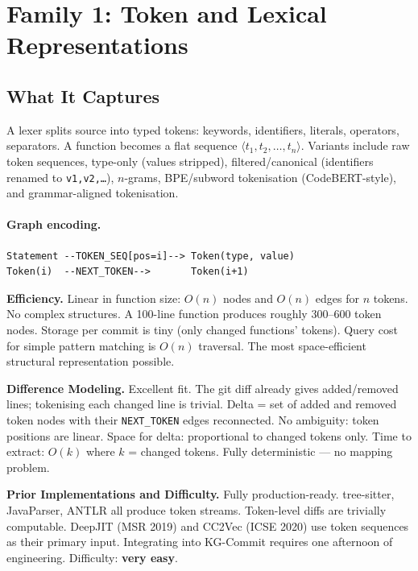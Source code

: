 \documentclass[12pt,a4paper]{article}
\begin{document}
\section{Family 1: Token and Lexical Representations}

\subsection{What It Captures}

A lexer splits source into typed tokens: keywords, identifiers, literals,
operators, separators. A function becomes a flat sequence
$\langle t_1, t_2, \ldots, t_n \rangle$. Variants include raw token sequences,
type-only (values stripped), filtered/canonical (identifiers renamed to
\texttt{v1,v2,\ldots}), $n$-grams, BPE/subword tokenisation (CodeBERT-style),
and grammar-aligned tokenisation.

\paragraph{Graph encoding.}
\begin{lstlisting}
Statement --TOKEN_SEQ[pos=i]--> Token(type, value)
Token(i)  --NEXT_TOKEN-->       Token(i+1)
\end{lstlisting}

\begin{effbox}
\textbf{Efficiency.}
Linear in function size: $O(n)$ nodes and $O(n)$ edges for $n$ tokens.
No complex structures. A 100-line function produces roughly 300--600 token
nodes. Storage per commit is tiny (only changed functions' tokens). Query cost
for simple pattern matching is $O(n)$ traversal. The most space-efficient
structural representation possible.
\end{effbox}

\begin{diffbox}
\textbf{Difference Modeling.}
Excellent fit. The git diff already gives added/removed lines; tokenising each
changed line is trivial. Delta = set of added and removed token nodes with their
\texttt{NEXT\_TOKEN} edges reconnected. No ambiguity: token positions are linear.
Space for delta: proportional to changed tokens only. Time to extract: $O(k)$
where $k$ = changed tokens. Fully deterministic — no mapping problem.
\end{diffbox}

\begin{implbox}
\textbf{Prior Implementations and Difficulty.}
Fully production-ready. tree-sitter, JavaParser, ANTLR all produce token
streams. Token-level diffs are trivially computable. DeepJIT (MSR 2019) and
CC2Vec (ICSE 2020) use token sequences as their primary input. Integrating into
KG-Commit requires one afternoon of engineering. Difficulty: \textbf{very easy}.
\end{implbox}
\end{document}
